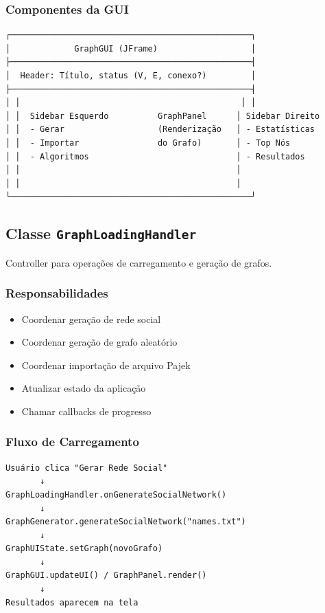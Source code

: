 \documentclass[12pt,a4paper]{article}
\begin{document}
    \subsubsection{Componentes da GUI}

    \begin{verbatim}
┌─────────────────────────────────────────────────┐
│             GraphGUI (JFrame)                   │
├─────────────────────────────────────────────────┤
│  Header: Título, status (V, E, conexo?)         │
├─────────────────────────────────────────────────┤
│ │                                             │ │
│ │  Sidebar Esquerdo          GraphPanel      │ Sidebar Direito
│ │  - Gerar                   (Renderização   │ - Estatísticas
│ │  - Importar                do Grafo)       │ - Top Nós
│ │  - Algoritmos                              │ - Resultados
│ │                                            │
│ │                                            │
└─────────────────────────────────────────────────┘
    \end{verbatim}

    \subsection{Classe \texttt{GraphLoadingHandler}}

    Controller para operações de carregamento e geração de grafos.

    \subsubsection{Responsabilidades}

    \begin{itemize}
        \item Coordenar geração de rede social
        \item Coordenar geração de grafo aleatório
        \item Coordenar importação de arquivo Pajek
        \item Atualizar estado da aplicação
        \item Chamar callbacks de progresso
    \end{itemize}

    \subsubsection{Fluxo de Carregamento}

    \begin{verbatim}
Usuário clica "Gerar Rede Social"
       ↓
GraphLoadingHandler.onGenerateSocialNetwork()
       ↓
GraphGenerator.generateSocialNetwork("names.txt")
       ↓
GraphUIState.setGraph(novoGrafo)
       ↓
GraphGUI.updateUI() / GraphPanel.render()
       ↓
Resultados aparecem na tela
    \end{verbatim}
\end{document}

